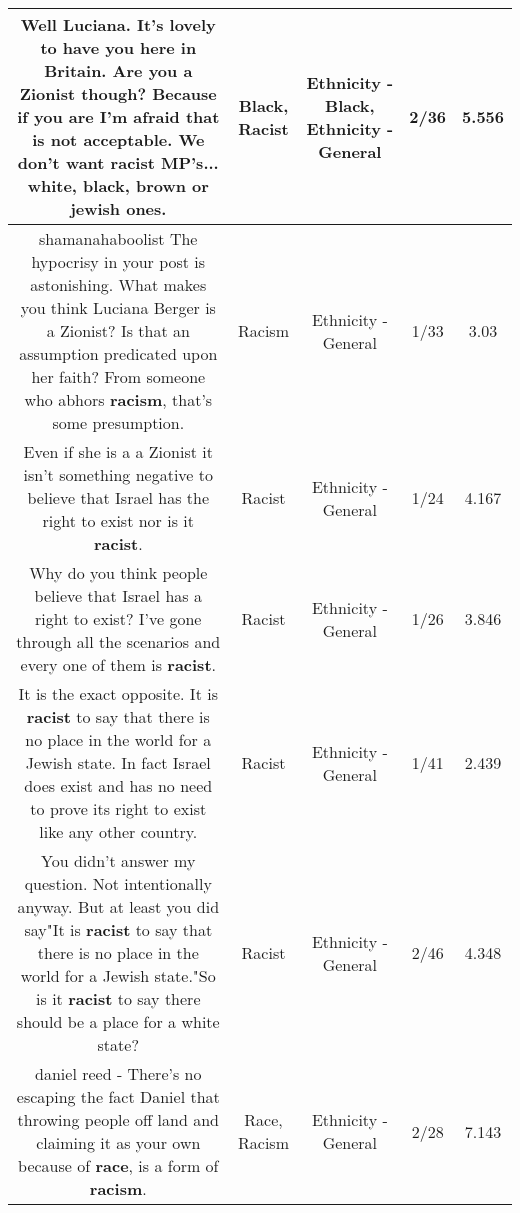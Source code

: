 \documentclass[11pt]{article}
\newlength\mylength
\begin{document}
\begin{center}
\begin{longtable}{|C{.65\mylength}|C{.30\mylength}|C{.12\mylength}|C{.12\mylength}|C{.12\mylength}|}
  \small Well Luciana. It's lovely to have you here in Britain. Are you a Zionist though? Because if you are I'm afraid that is not acceptable. We don't want \textbf{racist} MP's... white, \textbf{black}, brown or jewish ones.\normalsize   & Black, Racist & Ethnicity - Black, Ethnicity - General & 2/36 & 5.556 \\  \hline
  \small shamanahaboolist The hypocrisy in your post is astonishing. What makes you think Luciana Berger is a Zionist? Is that an assumption predicated upon her faith? From someone who abhors \textbf{racism}, that's some presumption.\normalsize   & Racism & Ethnicity - General & 1/33 & 3.03 \\  \hline
  \small Even if she is a a Zionist it isn't something negative to believe that Israel has the right to exist nor is it \textbf{racist}.\normalsize   & Racist & Ethnicity - General & 1/24 & 4.167 \\  \hline
  \small Why do you think people believe that Israel has a right to exist? I've gone through all the scenarios and every one of them is \textbf{racist}.\normalsize   & Racist & Ethnicity - General & 1/26 & 3.846 \\  \hline
  \small It is the exact opposite. It is \textbf{racist} to say that there is no place in the world for a Jewish state. In fact Israel does exist and has no need to prove its right to exist like any other country.\normalsize   & Racist & Ethnicity - General & 1/41 & 2.439 \\  \hline
  \small You didn't answer my question. Not intentionally anyway. But at least you did say"It is \textbf{racist} to say that there is no place in the world for a Jewish state."So is it \textbf{racist} to say there should be a place for a white state?\normalsize   & Racist & Ethnicity - General & 2/46 & 4.348 \\  \hline
  \small daniel reed - There's no escaping the fact Daniel that throwing people off land and claiming it as your own because of \textbf{race}, is a form of \textbf{racism}.\normalsize   & Race, Racism & Ethnicity - General & 2/28 & 7.143 \\  \hline

\end{longtable}
\end{center}
\end{document}

